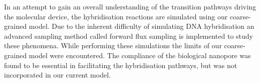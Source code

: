 In an attempt to gain an overall understanding of the transition pathways driving the
molecular device, the hybridisation reactions are simulated using our coarse-grained
model. Due to the inherent difficulty of simulating DNA hybridisation an advanced
sampling method called forward flux sampling is implemented to study these phenomena.
While performing these simulations the limits of our coarse-grained model were
encountered. The compliance of the biological nanopore was found to be essential in
facilitating the hybridisation pathways, but was not incorporated in our current model.



%
%
%
